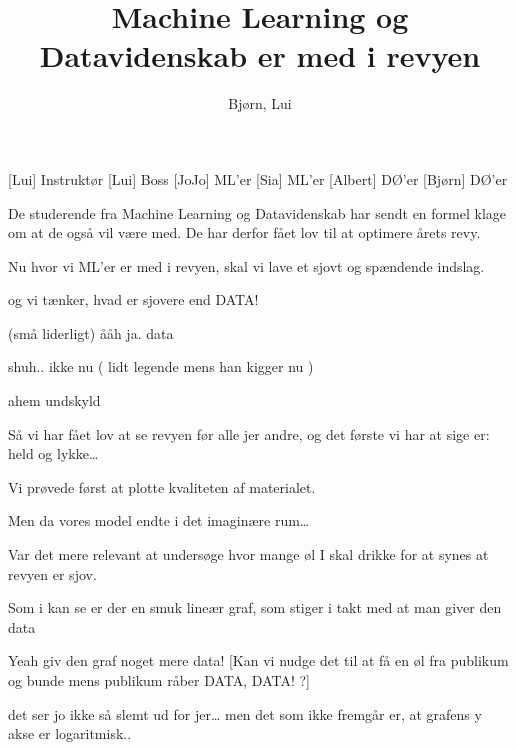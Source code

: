 \documentclass[a4paper,11pt]{article}
\title{Machine Learning og Datavidenskab er med i revyen}
\author{Bjørn, Lui}
\begin{document}
\maketitle

\begin{roles}
[Lui] Instruktør
[Lui] Boss
[JoJo] ML'er
[Sia] ML'er
[Albert] DØ'er
[Bjørn] DØ'er
\end{roles}

\begin{props}
\end{props}


\begin{sketch}

 De studerende fra Machine Learning og Datavidenskab har sendt en formel klage om at de også vil være med. De har derfor fået lov til at optimere årets revy.


 Nu hvor vi ML’er er med i revyen, skal vi lave et sjovt og spændende indslag.

 og vi tænker, hvad er sjovere end DATA!

 (små liderligt) ååh ja. data

 shuh.. ikke nu ( lidt legende mens han kigger nu ) 

 ahem undskyld

 Så vi har fået lov at se revyen før alle jer andre, og det første vi har at sige er: held og lykke…

 Vi prøvede først at plotte kvaliteten af materialet.

 Men da vores model endte i det imaginære rum…

 Var det mere relevant at undersøge hvor mange øl I skal drikke for at synes at revyen er sjov.


 Som i kan se er der en smuk lineær graf, som stiger i takt med at man giver den data

 Yeah giv den graf noget mere data!
[Kan vi nudge det til at få en øl fra publikum og bunde mens publikum råber DATA, DATA! ?]

 det ser jo ikke så slemt ud for jer… men det som ikke fremgår er, at grafens y akse er logaritmisk..


\end{sketch}
\end{document}
